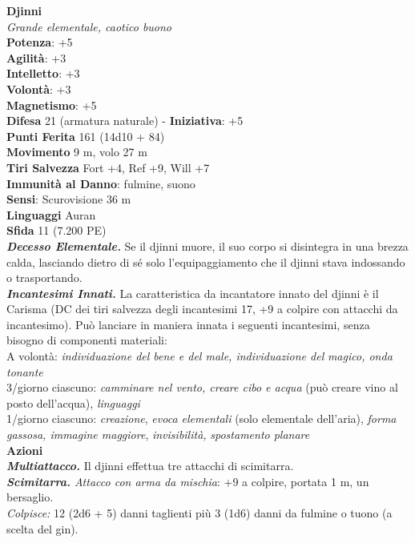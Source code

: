 \begin{multicols}{2}
\medskip\textbf{Djinni}\\
\emph{Grande elementale, caotico buono}\\
\textbf{Potenza}: +5\\
\textbf{Agilità}: +3\\
\textbf{Intelletto}: +3\\
\textbf{Volontà}: +3\\
\textbf{Magnetismo}: +5\\
\textbf{Difesa} 21 (armatura naturale) - \textbf{Iniziativa}: +5\\
\textbf{Punti Ferita} 161 (14d10 + 84)\\
\textbf{Movimento} 9 m, volo 27 m\\
\textbf{Tiri Salvezza} Fort +4, Ref +9, Will +7\\
\textbf{Immunità al Danno}: fulmine, suono\\
\textbf{Sensi}: Scurovisione 36 m\\
\textbf{Linguaggi} Auran\\
\textbf{Sfida} 11 (7.200 PE)\smallskip\\
\emph{\textbf{Decesso Elementale.}} Se il djinni muore, il suo corpo si disintegra in una brezza calda, lasciando dietro di sé solo l'equipaggiamento che il djinni stava indossando o trasportando.\\
\emph{\textbf{Incantesimi Innati.}} La caratteristica da incantatore innato del djinni è il Carisma (DC dei tiri salvezza degli incantesimi 17, +9 a colpire con attacchi da incantesimo). Può lanciare in maniera innata i seguenti incantesimi, senza bisogno di componenti materiali: \\
A volontà: \emph{individuazione del bene e del male, individuazione del} \emph{magico, onda tonante}\\
3/giorno ciascuno: \emph{camminare nel vento, creare cibo e acqua} (può creare vino al posto dell'acqua), \emph{linguaggi}\\
1/giorno ciascuno: \emph{creazione}, \emph{evoca elementali} (solo elementale dell'aria), \emph{forma gassosa, immagine maggiore}, \emph{invisibilità,} \emph{spostamento planare}\\
\smallskip\textbf{Azioni}\\
\emph{\textbf{Multiattacco.}} Il djinni effettua tre attacchi di scimitarra.\\
\emph{\textbf{Scimitarra.} Attacco con arma da mischia}: +9 a colpire, portata 1 m, un bersaglio.\\
\emph{Colpisce:} 12 (2d6 + 5) danni taglienti più 3 (1d6) danni da fulmine o tuono (a scelta del gin).\\

\end{multicols}
